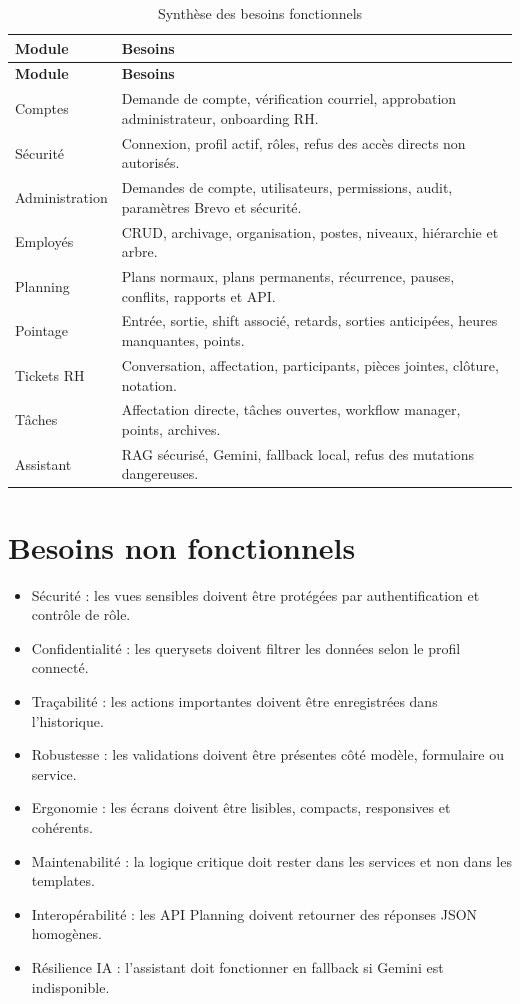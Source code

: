 \documentclass[12pt,a4paper]{report}
\begin{document}
\begin{longtable}{>{\raggedright\arraybackslash}p{3.5cm}>{\raggedright\arraybackslash}p{10.5cm}}
\caption{Synthèse des besoins fonctionnels}\label{tab:besoins-fonctionnels}\\
\toprule
\textbf{Module} & \textbf{Besoins} \\
\midrule
\endfirsthead
\toprule
\textbf{Module} & \textbf{Besoins} \\
\midrule
\endhead
Comptes & Demande de compte, vérification courriel, approbation administrateur, onboarding RH. \\
Sécurité & Connexion, profil actif, rôles, refus des accès directs non autorisés. \\
Administration & Demandes de compte, utilisateurs, permissions, audit, paramètres Brevo et sécurité. \\
Employés & CRUD, archivage, organisation, postes, niveaux, hiérarchie et arbre. \\
Planning & Plans normaux, plans permanents, récurrence, pauses, conflits, rapports et API. \\
Pointage & Entrée, sortie, shift associé, retards, sorties anticipées, heures manquantes, points. \\
Tickets RH & Conversation, affectation, participants, pièces jointes, clôture, notation. \\
Tâches & Affectation directe, tâches ouvertes, workflow manager, points, archives. \\
Assistant & RAG sécurisé, Gemini, fallback local, refus des mutations dangereuses. \\
\bottomrule
\end{longtable}


\section{Besoins non fonctionnels}
\begin{itemize}
\item Sécurité : les vues sensibles doivent être protégées par authentification et contrôle de rôle.
\item Confidentialité : les querysets doivent filtrer les données selon le profil connecté.
\item Traçabilité : les actions importantes doivent être enregistrées dans l'historique.
\item Robustesse : les validations doivent être présentes côté modèle, formulaire ou service.
\item Ergonomie : les écrans doivent être lisibles, compacts, responsives et cohérents.
\item Maintenabilité : la logique critique doit rester dans les services et non dans les templates.
\item Interopérabilité : les API Planning doivent retourner des réponses JSON homogènes.
\item Résilience IA : l'assistant doit fonctionner en fallback si Gemini est indisponible.
\end{itemize}
\end{document}
